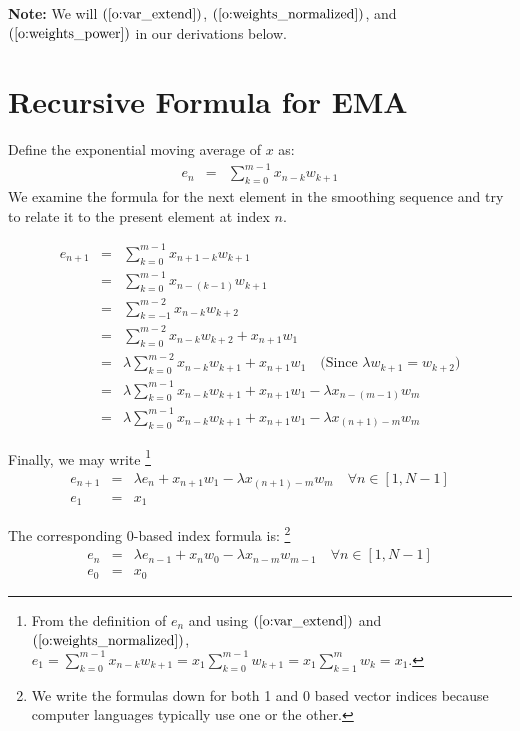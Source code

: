\documentclass{article}
\begin{document}
{\bf Note:\/} We will $(\ref{o:var_extend})$, $(\ref{o:weights_normalized})$,
and $(\ref{o:weights_power})$ in our derivations below.

\section{Recursive Formula for EMA}
Define the exponential moving average of $x$ as:
\begin{eqnarray}
e_n & = & \sum_{k=0}^{m-1} x_{n-k} w_{k+1}
\end{eqnarray}
We examine the formula for the next element in the smoothing sequence 
and try to relate it to the present element at index $n$.

\begin{eqnarray*}
e_{n+1} & = & \sum_{k=0}^{m-1} x_{n+1-k} w_{k+1} \\
        & = & \sum_{k=0}^{m-1} x_{n-(k-1)} w_{k+1} \\
        & = & \sum_{k=-1}^{m-2} x_{n-k} w_{k+2}  \\
        & = & \sum_{k=0}^{m-2} x_{n-k} w_{k+2}  + x_{n+1} w_1 \\
        & = & \lambda \sum_{k=0}^{m-2} x_{n-k} w_{k+1}  + x_{n+1} w_1  \quad \text{(Since $\lambda w_{k+1} = w_{k+2}$)} \\
        & = & \lambda \sum_{k=0}^{m-1} x_{n-k} w_{k+1}  + x_{n+1} w_1  
                - \lambda x_{n-(m-1)} w_m  \\
        & = & \lambda \sum_{k=0}^{m-1} x_{n-k} w_{k+1}  + x_{n+1} w_1  
                - \lambda x_{(n+1)-m} w_m 
\end{eqnarray*}

Finally, we may write%
\footnote{From the definition of $e_n$ and using 
$(\ref{o:var_extend})$ and $(\ref{o:weights_normalized})$,
$e_1 = \sum_{k=0}^{m-1} x_{n-k} w_{k+1} = x_1 \sum_{k=0}^{m-1} w_{k+1} = x_1 \sum_{k=1}^m w_k = x_1$.}
\begin{eqnarray}
    e_{n+1} & = & \lambda e_n + x_{n+1} w_1 - \lambda x_{(n+1)-m} w_m \quad \forall n \in [1, N-1] \\
    e_1     & = & x_1
\end{eqnarray}

The corresponding 0-based index formula is:%
\footnote{We write the formulas down for both 1 and  0 based vector indices because
computer languages typically use one or the other.}
\begin{eqnarray}
    e_{n} & = & \lambda e_{n-1} + x_{n} w_0 - \lambda x_{n-m} w_{m-1} \quad \forall n \in [1, N-1] \\
    e_0     & = & x_0
\end{eqnarray}
\end{document}
